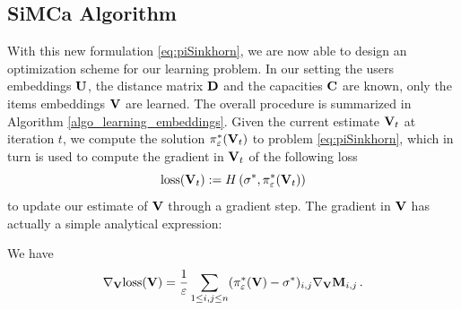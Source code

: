 \subsection*{SiMCa Algorithm}
With this new formulation \eqref{eq:piSinkhorn}, we are now able to design an optimization scheme for our learning problem. In our setting the users embeddings $\mathbf{U}$, the distance matrix $\mathbf{D}$ and the capacities $\mathbf{C}$ are known, only the items embeddings $\mathbf{V}$ are learned. The overall procedure is summarized in Algorithm \ref{algo_learning_embeddings}. Given the current estimate $\mathbf{V}_t$ at iteration $t$, we compute the solution $\pi^*_{\varepsilon}(\mathbf{V}_t)$ to problem \eqref{eq:piSinkhorn}, which in turn is used to compute the gradient in $\mathbf{V}_t$ of the following loss
\begin{equation}\label{eq:loss_global}
    \mathrm{loss}(\mathbf{V}_t) := H\left(\sigma^*,\pi^*_{\varepsilon}(\mathbf{V}_t)\right)
\end{equation} to update our estimate of $\mathbf{V}$ through a gradient step. The gradient in $\mathbf{V}$
has actually a simple analytical expression:

\begin{lemma}\label{lemma:gradient}
We have
    \begin{equation}
    \label{eq:gradient}
    \nabla_{\mathbf{V}} \mathrm{loss}(\mathbf{V}) = \frac{1}{\varepsilon} \sum_{1 \leq i,j \leq n} (\pi^*_\varepsilon(\mathbf{V}) - \sigma^*)_{i,j} \nabla_{\mathbf{V}} \mathbf{M}_{i,j} \, .
\end{equation}
\end{lemma}


